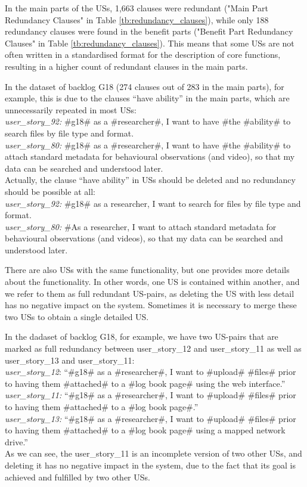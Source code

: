 In the main parts of the USs, 1,663 clauses were redundant ("Main Part Redundancy Clauses" in Table \ref{tb:redundancy_clauses}), while only 188 redundancy clauses were found in the benefit parts ("Benefit Part Redundancy Clauses" in Table \ref{tb:redundancy_clauses}). This means that some USs are not often written in a standardised format for the description of core functions, resulting in a higher count of redundant clauses in the main parts.
\begin{example}
	In the dataset of backlog G18 (274 clauses out of 283 in the main parts), for example, this is due to the clauses \enquote{have ability} in the main parts, which are unnecessarily repeated in most USs:\\
	\textit{user\_story\_92:} \#g18\# as a \#researcher\#, I want to have \#the \#ability\# to search files by file type and format.\\
	\textit{user\_story\_80:} \#g18\# as a \#researcher\#, I want to have \#the \#ability\# to attach standard metadata for behavioural observations (and video), so that my data can be searched and understood later.\\
	Actually, the clause \enquote{have ability} in USs should be deleted and no redundancy should be possible at all:\\
	\textit{user\_story\_92:} \#g18\# as a researcher, I want to search for files by file type and format.\\
	\textit{user\_story\_80:} \#As a researcher, I want to attach standard metadata for behavioural observations (and videos), so that my data can be searched and understood later.
\end{example}

There are also USs with the same functionality, but one provides more details about the functionality. In other words, one US is contained within another, and we refer to them as full
redundant US-pairs, as deleting the US with less detail has no negative impact on the system. Sometimes it is necessary to merge these two USs to obtain a single detailed US.
\begin{example}
	In the dadaset of backlog G18, for example, we have two US-pairs that are marked as full redundancy between user\_story\_12 and user\_story\_11 as well as user\_story\_13 and user\_story\_11:\\
	\textit{user\_story\_12}: \enquote{\#g18\# as a \#researcher\#, I want to \#upload\# \#files\# prior to having them \#attached\# to a \#log book page\# using the web interface.}\\
	\textit{user\_story\_11:} \enquote{\#g18\# as a \#researcher\#, I want to \#upload\# \#files\# prior to having them \#attached\# to a \#log book page\#.}\\
	\textit{user\_story\_13:} \enquote{\#g18\# as a \#researcher\#, I want to \#upload\# \#files\# prior to having them \#attached\# to a \#log book page\# using a mapped network drive.}\\
	
	As we can see, the user\_story\_11 is an incomplete version of two other USs, and deleting it has no negative impact in the system, due to the fact that its goal is achieved and fulfilled by two other USs.
\end{example}
